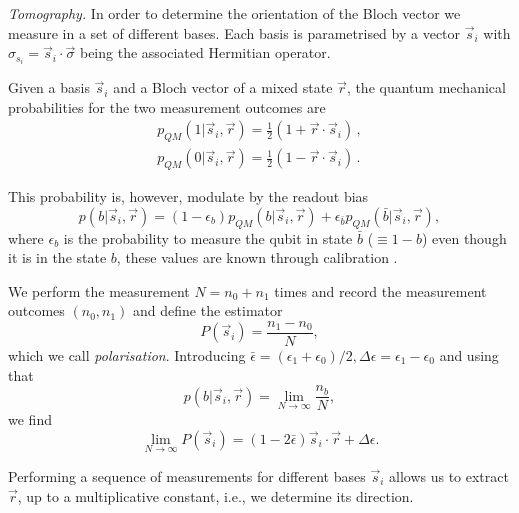 \documentclass[two column]{article}
\begin{document}
\emph{Tomography.} In order to determine the orientation of the Bloch vector we measure in a set of different bases. Each basis is parametrised by a vector $\vec{s}_i$ with $\sigma_{s_i} = \vec{s}_i \cdot \vec{\sigma}$ being the associated Hermitian operator.

Given a basis $\vec{s}_i$ and a Bloch vector of a mixed state $\vec{r}$, the quantum mechanical probabilities for the two measurement outcomes are
\begin{equation}\label{eqn:probs}
\begin{split}
p_{QM}(1|\vec{s}_i, \vec{r}) = \frac{1}{2}(1+\vec{r}\cdot\vec{s}_i)\,,\\
p_{QM}(0|\vec{s}_i, \vec{r}) = \frac{1}{2}(1-\vec{r}\cdot\vec{s}_i)\,.
\end{split}
\end{equation}

This probability is, however, modulate by the readout bias
\begin{equation}
    p(b|\vec{s}_i, \vec{r}) = (1-\epsilon_b)p_{QM}(b|\vec{s}_i, \vec{r}) + \epsilon_{\bar{b}} p_{QM}(\bar{b}|\vec{s}_i, \vec{r}), \label{eqn:marg}
\end{equation}
where $\epsilon_b$ is the probability to measure the qubit in state $\bar{b}$ ($\equiv 1-b$) even though it is in the state $b$, these values are known through calibration \cite{}.


We perform the measurement $N=n_0 + n_1$ times and record the measurement outcomes $(n_0, n_1)$ and define the estimator 
\begin{equation}
    P(\vec{s}_i) = \frac{n_1-n_0}{N},
\end{equation}
which we call \emph{polarisation}.
Introducing $\bar \epsilon = (\epsilon_1+\epsilon_0)/2, \Delta \epsilon = \epsilon_1-\epsilon_0$ and using that 
$$p(b|\vec{s}_i, \vec{r})=\lim_{N\to \infty} \frac{n_b}{N},$$
we find \begin{equation}
\lim_{N \to \infty} P(\vec{s}_i)=(1-2\bar\epsilon)\vec{s}_i \cdot \vec{r} + \Delta\epsilon.\label{eqn:estim}
\end{equation}
 
Performing a sequence of measurements for different bases $\vec{s}_i$ allows us to extract $\vec{r}$, up to a multiplicative constant, i.e., we determine its direction.
\end{document}
